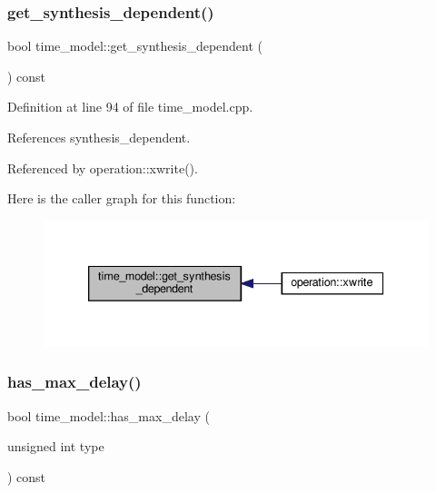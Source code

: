 \subsubsection{\texorpdfstring{get\+\_\+synthesis\+\_\+dependent()}{get\_synthesis\_dependent()}}
{\footnotesize\ttfamily bool time\+\_\+model\+::get\+\_\+synthesis\+\_\+dependent (\begin{DoxyParamCaption}{ }\end{DoxyParamCaption}) const}



Definition at line 94 of file time\+\_\+model.\+cpp.



References synthesis\+\_\+dependent.



Referenced by operation\+::xwrite().

Here is the caller graph for this function\+:
\nopagebreak
\begin{figure}[H]
\begin{center}
\leavevmode
\includegraphics[width=339pt]{d3/d73/classtime__model_a45cff932d6a65cc0fa68ac30b2222c19_icgraph}
\end{center}
\end{figure}
\mbox{\label{classtime__model_a952ed32fa9811586da4af0c94471f7ae}} 
\subsubsection{\texorpdfstring{has\+\_\+max\+\_\+delay()}{has\_max\_delay()}}
{\footnotesize\ttfamily bool time\+\_\+model\+::has\+\_\+max\+\_\+delay (\begin{DoxyParamCaption}\item[{unsigned int}]{type }\end{DoxyParamCaption}) const}



